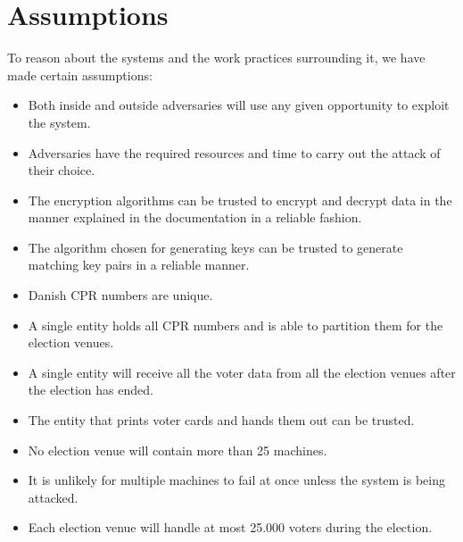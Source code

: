 \documentclass[a4paper]{report}
\begin{document}
\chapter{Assumptions}
To reason about the systems and the work practices surrounding it, we have made certain assumptions:
\begin{itemize}
\item Both inside and outside adversaries will use any given opportunity to exploit the system. 
\item Adversaries have the required resources and time to carry out the attack of their choice.
\item The encryption algorithms can be trusted to encrypt and decrypt data in the manner explained in the documentation in a reliable fashion.
\item The algorithm chosen for generating keys can be trusted to generate matching key pairs in a reliable manner.
\item Danish CPR numbers are unique.
\item A single entity holds all CPR numbers and is able to partition them for the election venues.
\item A single entity will receive all the voter data from all the election venues after the election has ended.
\item The entity that prints voter cards and hands them out can be trusted.
\item No election venue will contain more than 25 machines.
\item It is unlikely for multiple machines to fail at once unless the system is being attacked.
\item Each election venue will handle at most 25.000 voters during the election.
\end{itemize}
\end{document}
